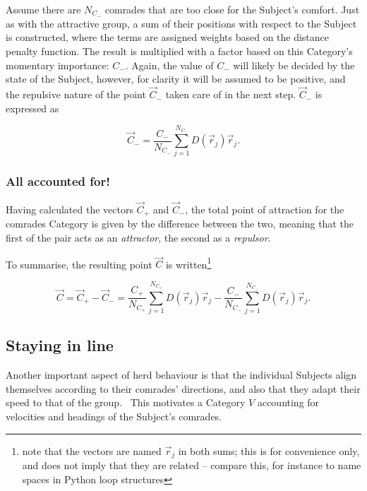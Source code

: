 \documentclass[]{article} %
\begin{document}
Assume there are $N_{C_-}$ comrades that are too close for the Subject's comfort.
Just as with the attractive group, a sum of their positions with respect to the Subject is constructed, where the terms are assigned weights based on the distance penalty function.
The result is multiplied with a factor based on this Category's momentary importance: $C_-$.
Again, the value of $C_-$ will likely be decided by the state of the Subject, however, for clarity it will be assumed to be positive, and the repulsive nature of the point $\vec{C}_-$ taken care of in the next step.
$\vec{C}_-$ is expressed as

\begin{equation}
 \label{eq:bad_comrades}
 \vec{C}_- =  \frac{C_-}{N_{C_-}} \sum_{j=1}^{N_{C_-}} D(\vec{r}_j) \vec{r}_j.
\end{equation}


\subsubsection{All accounted for!}
\label{sec:all_comrades}
Having calculated the vectors $\vec{C}_+$ and $\vec{C}_-$, the total point of attraction for the comrades Category is given by the difference between the two, meaning that the first of the pair acts as an \emph{attractor}, the second as a \emph{repulsor}.

To summarise, the resulting point $\vec{C}$ is written\footnote{note that the vectors are named $\vec{r}_j$ in both sums; this is for convenience only, and does not imply that they are related -- compare this, for instance to name spaces in Python loop structures}

\begin{equation}
 \label{eq:comrades}
 \vec{C} = \vec{C}_+ - \vec{C}_- = \frac{C_+}{N_{C_+}} \sum_{j=1}^{N_{C_+}} D(\vec{r}_j) \vec{r}_j -
                                   \frac{C_-}{N_{C_-}} \sum_{j=1}^{N_{C_-}} D(\vec{r}_j) \vec{r}_j.
\end{equation}


\subsection{Staying in line}
\label{sec:velocities}
Another important aspect of herd behaviour is that the individual Subjects align themselves according to their comrades' directions, and also that they adapt their speed to that of the group.~\cite{Reynolds1987}
This motivates a Category $V$ accounting for velocities and headings of the Subject's comrades.
\end{document}
